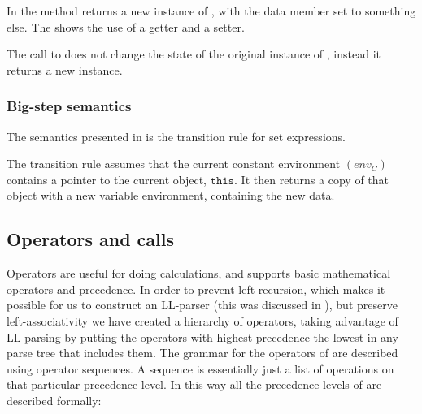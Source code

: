 
In  the method  returns a new instance of
, with the data member  set to something else. The
 shows the use of a getter and a setter.


The call to  does not change the state of the original
instance of , instead it returns a new instance.

\subsubsection{Big-step semantics}

The semantics presented in  is the transition rule for
set expressions.



The transition rule assumes that the current constant environment $(env_C)$
contains a pointer to the current object, $\texttt{this}$. It then returns a
copy of that object with a new variable environment, containing the new data.

\subsection{Operators and calls}
\label{sec:operatorsandcalls}

Operators are useful for doing calculations, and \productname{} supports
basic mathematical operators and precedence. In order to prevent
left-recursion, which makes it possible for us to construct an LL-parser
(this was discussed in ), but
preserve left-associativity we have created a hierarchy of operators,
taking advantage of LL-parsing by putting the operators with highest
precedence the lowest in any parse tree that includes them. The grammar
for the operators of \productname{} are described using operator
sequences. A sequence is essentially just a list of operations on that
particular precedence level. In this way all the precedence levels of
\productname{} are described formally:

\begin{ebnf}
\end{ebnf}

